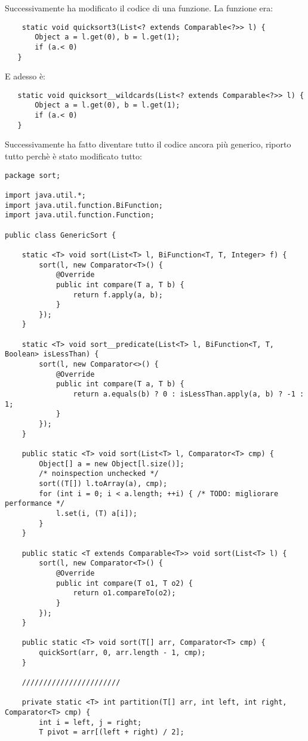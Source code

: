\noindent Successivamente ha modificato il codice di una funzione. La funzione era:
\begin{lstlisting}
    static void quicksort3(List<? extends Comparable<?>> l) {
       Object a = l.get(0), b = l.get(1);
       if (a.< 0)
   } 
\end{lstlisting}

\noindent E adesso è:
\begin{lstlisting}
   static void quicksort__wildcards(List<? extends Comparable<?>> l) {
       Object a = l.get(0), b = l.get(1);
       if (a.< 0)
   } 
\end{lstlisting}
\noindent Successivamente ha fatto diventare tutto il codice ancora più generico, riporto tutto perchè è stato modificato tutto:
\begin{lstlisting}
package sort;

import java.util.*;
import java.util.function.BiFunction;
import java.util.function.Function;

public class GenericSort {

    static <T> void sort(List<T> l, BiFunction<T, T, Integer> f) {
        sort(l, new Comparator<T>() {
            @Override
            public int compare(T a, T b) {
                return f.apply(a, b);
            }
        });
    }

    static <T> void sort__predicate(List<T> l, BiFunction<T, T, Boolean> isLessThan) {
        sort(l, new Comparator<>() {
            @Override
            public int compare(T a, T b) {
                return a.equals(b) ? 0 : isLessThan.apply(a, b) ? -1 : 1;
            }
        });
    }

    public static <T> void sort(List<T> l, Comparator<T> cmp) {
        Object[] a = new Object[l.size()];
        /* noinspection unchecked */
        sort((T[]) l.toArray(a), cmp);
        for (int i = 0; i < a.length; ++i) { /* TODO: migliorare performance */
            l.set(i, (T) a[i]);
        }
    }

    public static <T extends Comparable<T>> void sort(List<T> l) {
        sort(l, new Comparator<T>() {
            @Override
            public int compare(T o1, T o2) {
                return o1.compareTo(o2);
            }
        });
    }

    public static <T> void sort(T[] arr, Comparator<T> cmp) {
        quickSort(arr, 0, arr.length - 1, cmp);
    }

    ///////////////////////

    private static <T> int partition(T[] arr, int left, int right, Comparator<T> cmp) {
        int i = left, j = right;
        T pivot = arr[(left + right) / 2];


\end{lstlisting}

